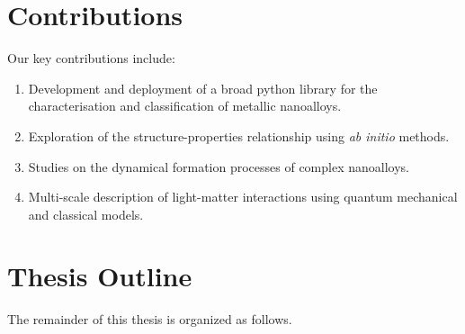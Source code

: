 \section{Contributions}
\label{s:Contributions}

Our key contributions include:

\begin{enumerate}

  \item Development and deployment of a broad python library for the characterisation and classification of metallic nanoalloys.
  
  \item Exploration of the structure-properties relationship using \textit{ab initio} methods.
  
  \item Studies on the dynamical formation processes of complex nanoalloys.
  
  \item Multi-scale description of light-matter interactions using quantum mechanical and classical models.

\end{enumerate}

\section{Thesis Outline}
\label{s:Outline}

The remainder of this thesis is organized as follows. 

